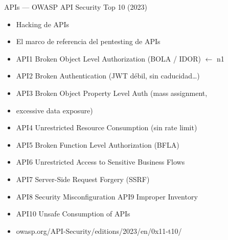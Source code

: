 \documentclass[aspectratio=169,10pt]{beamer}
\begin{document}
\begin{frame}[allowframebreaks]{APIs --- OWASP API Security Top 10 (2023)}
\small
  \begin{itemize}
  \item Hacking de APIs
  \item El marco de referencia del pentesting de APIs
  \item API1 Broken Object Level Authorization (BOLA / IDOR) $\leftarrow$ n1
  \item API2 Broken Authentication (JWT débil, sin caducidad\dots{})
  \item API3 Broken Object Property Level Auth (mass assignment,
  \item excessive data exposure)
  \item API4 Unrestricted Resource Consumption (sin rate limit)
  \item API5 Broken Function Level Authorization (BFLA)
  \item API6 Unrestricted Access to Sensitive Business Flows
  \item API7 Server-Side Request Forgery (SSRF)
  \item API8 Security Misconfiguration API9 Improper Inventory
  \item API10 Unsafe Consumption of APIs
  \item owasp.org/API-Security/editions/2023/en/0x11-t10/
  \end{itemize}
\end{frame}
\end{document}
